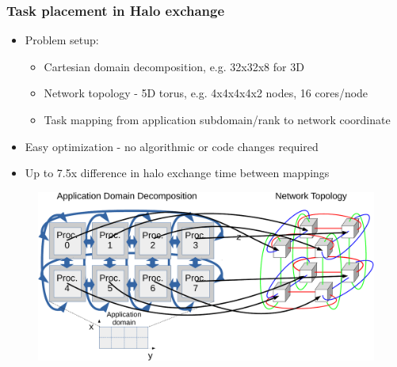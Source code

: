 \documentclass{beamer}
\begin{document}
\begin{frame}
\frametitle{Task placement in Halo exchange}
\begin{itemize}
\item Problem setup:
  \begin{itemize}
    \item Cartesian domain decomposition, e.g. 32x32x8 for 3D
    \item Network topology - 5D torus, e.g. 4x4x4x4x2 nodes, 16 cores/node
    \item Task mapping from application subdomain/rank to network coordinate
  \end{itemize}
\item Easy optimization - no algorithmic or code changes required
\item Up to 7.5x difference in halo exchange time between mappings
\end{itemize}
\vspace{-1.0em}
\begin{figure}
  \centering
  \includegraphics[width=0.75\linewidth]{../fig/halo-mapping}
\end{figure}
\end{frame}

\end{document}
